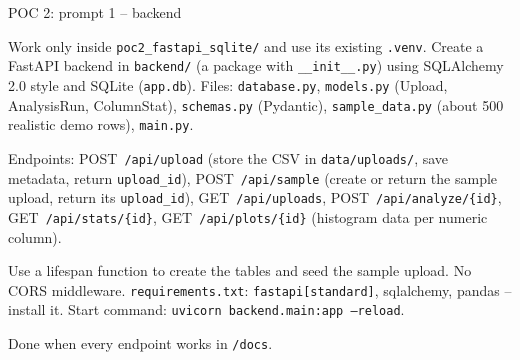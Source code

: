 \documentclass[aspectratio=169,11pt]{beamer}
\begin{document}
\begin{frame}{POC 2: prompt 1 -- backend}
  \vspace{2pt}
  \begin{promptbox}
    Work only inside \texttt{poc2\_fastapi\_sqlite/} and use its existing \texttt{.venv}. Create a FastAPI backend in \texttt{backend/} (a package with \texttt{\_\_init\_\_.py}) using SQLAlchemy 2.0 style and SQLite (\texttt{app.db}). Files: \texttt{database.py}, \texttt{models.py} (Upload, AnalysisRun, ColumnStat), \texttt{schemas.py} (Pydantic), \texttt{sample\_data.py} (about 500 realistic demo rows), \texttt{main.py}.
    \par\smallskip
    Endpoints: POST~\texttt{/api/upload} (store the CSV in \texttt{data/uploads/}, save metadata, return \texttt{upload\_id}), POST~\texttt{/api/sample} (create or return the sample upload, return its \texttt{upload\_id}), GET~\texttt{/api/uploads}, POST~\texttt{/api/analyze/\{id\}}, GET~\texttt{/api/stats/\{id\}}, GET~\texttt{/api/plots/\{id\}} (histogram data per numeric column).
    \par\smallskip
    Use a lifespan function to create the tables and seed the sample upload. No CORS middleware. \texttt{requirements.txt}: \texttt{fastapi[standard]}, sqlalchemy, pandas -- install it. Start command: \mbox{\texttt{uvicorn backend.main:app --reload}}.
    \par\smallskip
    Done when every endpoint works in \texttt{/docs}.
  \end{promptbox}
\end{frame}
\end{document}
